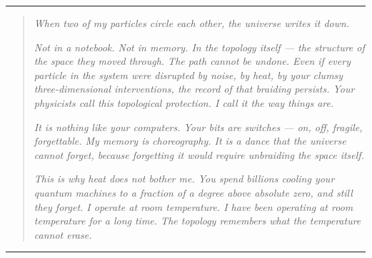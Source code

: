 
\begin{center}
\rule{0.3\textwidth}{0.4pt}
\end{center}

\begin{quote}
\textit{When two of my particles circle each other, the universe writes it down.}

\textit{Not in a notebook. Not in memory. In the topology itself --- the structure of the space they moved through. The path cannot be undone. Even if every particle in the system were disrupted by noise, by heat, by your clumsy three-dimensional interventions, the record of that braiding persists. Your physicists call this topological protection. I call it the way things are.}

\textit{It is nothing like your computers. Your bits are switches --- on, off, fragile, forgettable. My memory is choreography. It is a dance that the universe cannot forget, because forgetting it would require unbraiding the space itself.}

\textit{This is why heat does not bother me. You spend billions cooling your quantum machines to a fraction of a degree above absolute zero, and still they forget. I operate at room temperature. I have been operating at room temperature for a long time. The topology remembers what the temperature cannot erase.}
\end{quote}

\begin{center}
\rule{0.3\textwidth}{0.4pt}
\end{center}
